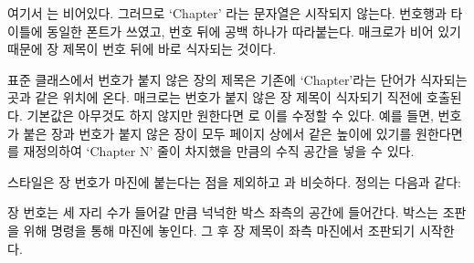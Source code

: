 여기서 \cmd{\printchaptername} 는 비어있다. 그러므로 `Chapter' 라는 문자열은
시작되지 않는다. 번호행과 타이틀에 동일한 폰트가 쓰였고, 번호 뒤에 공백 하나가 따라붙는다.
\cmd{\afterchapternum} 매크로가 비어 있기 때문에 장 제목이 번호 뒤에 바로 식자되는 것이다.


표준 클래스에서 번호가 붙지 않은 장의 제목은 기존에 `Chapter'라는 단어가 식자되는
곳과 같은 위치에 온다.
\cmd{\printchapternonum} 매크로는 번호가 붙지 않은 장 제목이 식자되기 직전에 호출된다.
기본값은 아무것도 하지 않지만 원한다면 \cmd{\renewcommand}로 이를 수정할 수 있다.
예를 들면, 번호가 붙은 장과 번호가 붙지 않은 장이 모두 페이지 상에서 같은 높이에 있기를 원한다면
\cmd{\printchapternonum} 를 재정의하여 `Chapter N' 줄이 차지했을 만큼의
수직 공간을 넣을 수 있다.

 스타일은 장 번호가 마진에 붙는다는 점을 제외하고
 과 비슷하다.
정의는 다음과 같다:
\begin{lcode}
\end{lcode}
장 번호는 세 자리 수가 들어갈 만큼 넉넉한 박스 좌측의 공간에 들어간다.
박스는 조판을 위해 \cmd{\llap} 명령을 통해 마진에 놓인다.
그 후 장 제목이 좌측 마진에서 조판되기 시작한다.


